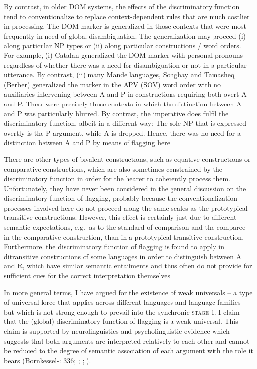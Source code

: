 \documentclass[output=paper]{langsci/langscibook}
\begin{document}
By contrast, in older DOM systems, the effects of the discriminatory function tend to conventionalize to replace context-dependent rules that are much costlier in processing. The DOM marker is generalized in those contexts that were most frequently in need of global disambiguation. The generalization may proceed (i) along particular NP types or (ii) along particular constructions / word orders. For example, (i) Catalan generalized the DOM marker with personal pronouns regardless of whether there was a need for disambiguation or not in a particular utterance. By contrast, (ii) many Mande languages, Songhay and Tamasheq (Berber) generalized the marker in the APV (SOV) word order with no auxiliaries intervening between A and P in constructions requiring both overt A and P. These were precisely those contexts in which the distinction between A and P was particularly blurred. By contrast, the imperative does fulfil the discriminatory function, albeit in a different way: The sole NP that is expressed overtly is the P argument, while A is dropped. Hence, there was no need for a distinction between A and P by means of flagging here.

There are other types of bivalent constructions, such as equative constructions or comparative constructions, which are also sometimes constrained by the discriminatory function in order for the hearer to coherently process them. Unfortunately, they have never been considered in the general discussion on the discriminatory function of flagging, probably because the conventionalization processes involved here do not proceed along the same scales as the prototypical transitive constructions. However, this effect is certainly just due to different semantic expectations, e.g., as to the standard of comparison and the comparee in the comparative construction, than in a prototypical transitive construction. Furthermore, the discriminatory function of flagging is found to apply in ditransitive constructions of some languages in order to distinguish between A and R, which have similar semantic entailments and thus often do not provide for sufficient cues for the correct interpretation themselves. 

In more general terms, I have argued for the existence of weak universals – a type of universal force that applies across different languages and language families but which is not strong enough to prevail into the synchronic \textsc{stage} 1. I claim that the (global) discriminatory function of flagging is a weak universal. This claim is supported by neurolinguistics and psycholinguistic evidence which suggests that both arguments are interpreted relatively to each other and cannot be reduced to the degree of semantic association of each argument with the role it bears (Bornkessel-\citealt{SchlesewskySchlesewsky2015}: 336; \citealt{AhnCho2007}; \citealt{FedzechkinaEtAl2012}; \citealt{KurumadaJaeger2015}).
\end{document}
